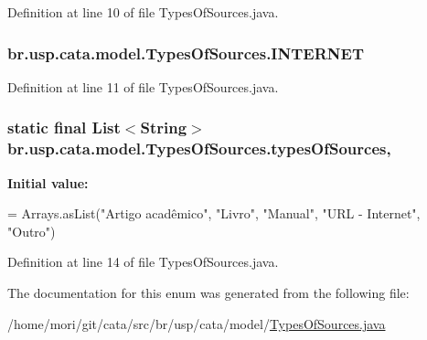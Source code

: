 Definition at line 10 of file Types\+Of\+Sources.\+java.

\hypertarget{enumbr_1_1usp_1_1cata_1_1model_1_1_types_of_sources_a574f300d9b2bee7d49ccb97e23120fc6}{
\subsubsection[{I\+N\+T\+E\+R\+N\+E\+T}]{\setlength{\rightskip}{0pt plus 5cm}br.\+usp.\+cata.\+model.\+Types\+Of\+Sources.\+I\+N\+T\+E\+R\+N\+E\+T}}\label{enumbr_1_1usp_1_1cata_1_1model_1_1_types_of_sources_a574f300d9b2bee7d49ccb97e23120fc6}


Definition at line 11 of file Types\+Of\+Sources.\+java.

\hypertarget{enumbr_1_1usp_1_1cata_1_1model_1_1_types_of_sources_a4c1af95e78da5bc6041a3fbc985b22bc}{
\subsubsection[{types\+Of\+Sources}]{\setlength{\rightskip}{0pt plus 5cm} static  final List$<$String$>$ br.\+usp.\+cata.\+model.\+Types\+Of\+Sources.\+types\+Of\+Sources\hspace{0.3cm}{\ttfamily [static]}, {\ttfamily [private]}}}\label{enumbr_1_1usp_1_1cata_1_1model_1_1_types_of_sources_a4c1af95e78da5bc6041a3fbc985b22bc}
{\bfseries Initial value\+:}
\begin{DoxyCode}
= 
        Arrays.asList(\textcolor{stringliteral}{"Artigo acadêmico"}, \textcolor{stringliteral}{"Livro"}, \textcolor{stringliteral}{"Manual"}, \textcolor{stringliteral}{"URL - Internet"}, \textcolor{stringliteral}{"Outro"})
\end{DoxyCode}


Definition at line 14 of file Types\+Of\+Sources.\+java.



The documentation for this enum was generated from the following file\+:\begin{DoxyCompactItemize}
\item 
/home/mori/git/cata/src/br/usp/cata/model/\hyperlink{_types_of_sources_8java}{Types\+Of\+Sources.\+java}\end{DoxyCompactItemize}
